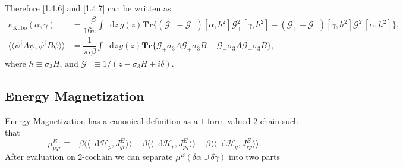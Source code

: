 \documentclass[10pt,nofootinbib]{revtex4}
\newcommand*\dd{\mathop{}\!\mathrm{d}}
\begin{document}
		Therefore \eqref{1.4.6} and \eqref{1.4.7} can be written as
		\begin{align}
			\kappa_{\text{Kubo}}(\alpha,\gamma)&=\dfrac{-\beta}{16\pi}\int\dd z\,g(z)\mathbf{Tr}\bigg\{(\mathcal{G}_+ - \mathcal{G}_-)[\alpha,h^2]\mathcal{G}_+^2[\gamma,h^2]-(\mathcal{G}_+ - \mathcal{G}_-)[\gamma,h^2]\mathcal{G}_-^2[\alpha,h^2]\bigg\},\label{1.4.9}\\
			\langle \langle \psi^\dagger A\psi,\psi^\dagger B\psi\rangle\rangle&=\dfrac{1}{\pi i\beta}\int\dd z\,g(z)\mathbf{Tr}\bigg\{\mathcal{G}_+\sigma_3 A\mathcal{G}_+\sigma_3 B-\mathcal{G}_-\sigma_3A\mathcal{G}_-\sigma_3 B\bigg\},\label{1.4.10}
		\end{align}
		where $h\equiv\sigma_3 H$, and $\mathcal{G}_{\pm}\equiv1/(z-\sigma_3H\pm i\delta)$.


	\subsection{Energy Magnetization}
		Energy Magnetization has a canonical definition as a $1$-form valued $2$-chain \cite{kitaev2006anyons,kapustin2019thermal} such that
		\begin{equation}\label{1.5.1}
			\mu^E_{pqr}\equiv-\beta \langle\langle\dd \mathcal{H}_p,J^E_{qr}\rangle\rangle-\beta \langle\langle\dd \mathcal{H}_r,J^E_{pq}\rangle\rangle-\beta \langle\langle\dd \mathcal{H}_q,J^E_{rp}\rangle\rangle.
		\end{equation}
		After evaluation on $2$-cochain we can separate $\mu^E(\delta \alpha\cup\delta\gamma)$ into two parts
\end{document}

